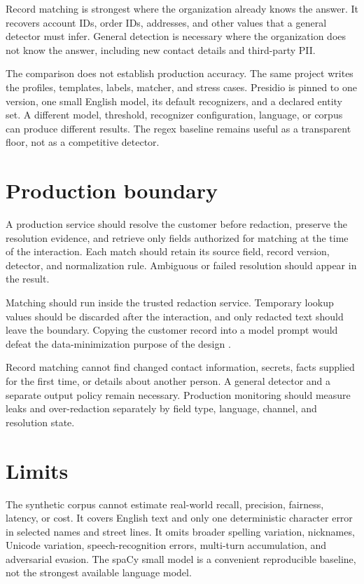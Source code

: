 \documentclass[11pt]{article}
\begin{document}
Record matching is strongest where the organization already knows the answer.
It recovers account IDs, order IDs, addresses, and other values that a general
detector must infer. General detection is necessary where the organization does
not know the answer, including new contact details and third-party PII.

The comparison does not establish production accuracy. The same project writes
the profiles, templates, labels, matcher, and stress cases. Presidio is pinned
to one version, one small English model, its default recognizers, and a declared
entity set. A different model, threshold, recognizer configuration, language,
or corpus can produce different results. The regex baseline remains useful as a
transparent floor, not as a competitive detector.

\section*{Production boundary}

A production service should resolve the customer before redaction, preserve the
resolution evidence, and retrieve only fields authorized for matching at the
time of the interaction. Each match should retain its source field, record
version, detector, and normalization rule. Ambiguous or failed resolution
should appear in the result.

Matching should run inside the trusted redaction service. Temporary lookup
values should be discarded after the interaction, and only redacted text should
leave the boundary. Copying the customer record into a model prompt would
defeat the data-minimization purpose of the design \citep{nist800122}.

Record matching cannot find changed contact information, secrets, facts
supplied for the first time, or details about another person. A general detector
and a separate output policy remain necessary. Production monitoring should
measure leaks and over-redaction separately by field type, language, channel,
and resolution state.

\section*{Limits}

The synthetic corpus cannot estimate real-world recall, precision, fairness,
latency, or cost. It covers English text and only one deterministic character
error in selected names and street lines. It omits broader spelling variation,
nicknames, Unicode variation, speech-recognition errors, multi-turn
accumulation, and adversarial evasion. The spaCy small model is a convenient
reproducible baseline, not the strongest available language model.
\end{document}
